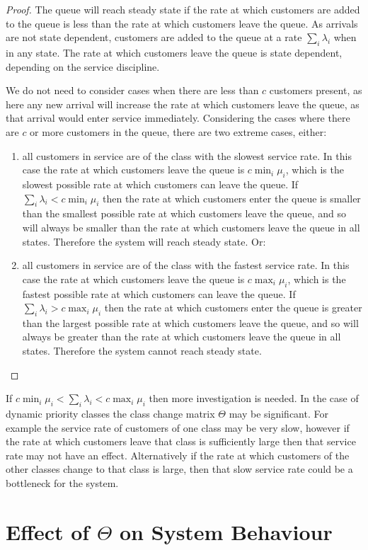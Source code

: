 \documentclass{article}
\begin{document}
\begin{proof}
The queue will reach steady state if the rate at which customers are added to
the queue is less than the rate at which customers leave the queue.
As arrivals are not state dependent, customers are added to the queue at a rate
$\sum_i \lambda_i$ when in any state.
The rate at which customers leave the queue is state dependent, depending on the
service discipline.

We do not need to consider cases when there are less than $c$ customers present,
as here any new arrival will increase the rate at which customers leave the
queue, as that arrival would enter service immediately.
Considering the cases where there are $c$ or more customers in the queue, there
are two extreme cases, either:

\begin{enumerate}
  \item all customers in service are of the class with the slowest service rate.
  In this case the rate at which customers leave the queue is $c \min_i \mu_i$,
  which is the slowest possible rate at which customers can leave the queue.
  If $\sum_i \lambda_i < c \min_i \mu_i$ then the rate at which customers enter
  the queue is smaller than the smallest possible rate at which customers leave
  the queue, and so will always be smaller than the rate at which customers
  leave the queue in all states. Therefore the system will reach steady state.
  Or:
  \item all customers in service are of the class with the fastest service rate.
  In this case the rate at which customers leave the queue is $c \max_i \mu_i$,
  which is the fastest possible rate at which customers can leave the queue.
  If $\sum_i \lambda_i > c \max_i \mu_i$ then the rate at which customers enter
  the queue is greater than the largest possible rate at which customers leave
  the queue, and so will always be greater than the rate at which customers
  leave the queue in all states. Therefore the system cannot reach steady state.
\end{enumerate}
\end{proof}

If $c \min_i \mu_i < \sum_i \lambda_i < c \max_i \mu_i$ then more investigation
is needed. In the case of dynamic priority classes the class change matrix
$\Theta$ may be significant. For example the service rate of customers of one
class may be very slow, however if the rate at which customers leave that class
is sufficiently large then that service rate may not have an effect.
Alternatively if the rate at which customers of the other classes change to that
class is large, then that slow service rate could be a bottleneck for the
system.




\section{Effect of $\Theta$ on System Behaviour}\label{sec:behaviour}



\end{document}
